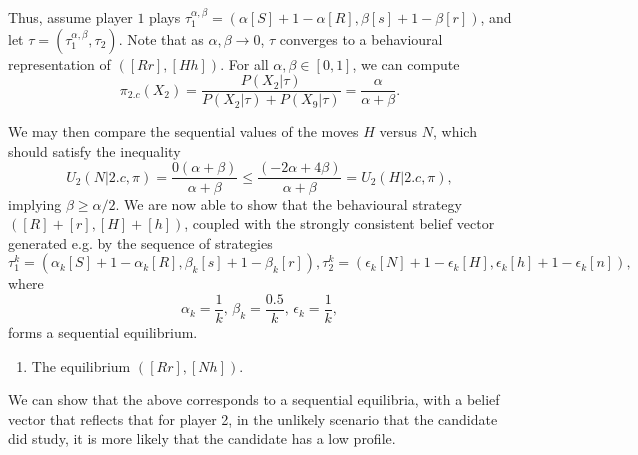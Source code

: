 \begin{example}
Thus, assume player $1$ plays $\tau_1^{\alpha, \beta} = (\alpha[S] + 1-\alpha [R],\beta[s] + 1-\beta [r] )$, and let $\tau = (\tau_{1}^{\alpha, \beta}, \tau_2)$. Note that as $\alpha, \beta  \rightarrow 0$, $\tau$ converges to a behavioural representation of $([Rr], [Hh])$.
For all $\alpha, \beta \in [0,1]$, we can compute
$$\pi_{2.c}(X_2) = \frac{P(X_2 | \tau)}{ P(X_2 | \tau) + P(X_9 | \tau) }  = \frac{\alpha}{\alpha + \beta}.$$

We may then compare the sequential values of the moves $H$ versus $N$, which should satisfy the inequality
$$ U_2(N | 2.c, \pi) = \frac{0 (\alpha + \beta)}{\alpha + \beta} \leq \frac{( - 2\alpha + 4 \beta)}{\alpha + \beta} = U_2(H | 2.c , \pi),  $$
implying $\beta  \geq \alpha/2$.
We are now able to show that the behavioural strategy $([R] + [r], [H] + [h])$, coupled with the strongly consistent belief vector generated e.g. by the sequence of strategies
$$ \tau_1^k = (\alpha_k [S] + 1-\alpha_k [R], \beta_k [s] + 1-\beta_k [r]), \tau_2^k = (\epsilon_k [N] + 1 - \epsilon_k [H], \epsilon_k [h] +  1-\epsilon_k [n]), $$
where
$$\alpha_k =\frac{1}{k}, \, \beta_k = \frac{0.5}{k}, \, \epsilon_k = \frac{1}{k},$$
forms a sequential equilibrium.

\begin{enumerate}[resume]
\item The equilibrium $([Rr], [Nh])$.
\end{enumerate}

We can show that the above corresponds to a sequential equilibria, with a belief vector that reflects that for player 2, in the unlikely scenario that the candidate did study, it is more likely that the candidate has a low profile.
\end{example}
\ifx \globalmark \undefined %


	
\else

\fi
